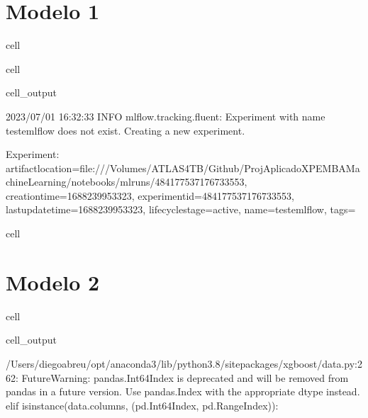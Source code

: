 \documentclass[letterpaper,10pt,brazil]{sphinxmanual}
\begin{document}
\section{Modelo 1}
\label{\detokenize{notebooks/teste:modelo-1}}
\begin{sphinxuseclass}{cell}
\end{sphinxuseclass}
\begin{sphinxuseclass}{cell}
\begin{sphinxuseclass}{cell_output}
\begin{sphinxVerbatim}[commandchars=\\\{\}]
2023/07/01 16:32:33 INFO mlflow.tracking.fluent: Experiment with name \PYGZsq{}teste\PYGZhy{}mlflow\PYGZsq{} does not exist. Creating a new experiment.
\end{sphinxVerbatim}

\begin{sphinxVerbatim}[commandchars=\\\{\}]
\PYGZlt{}Experiment: artifact\PYGZus{}location=\PYGZsq{}file:///Volumes/ATLAS\PYGZus{}4TB/Github/Proj\PYGZhy{}Aplicado\PYGZhy{}XPE\PYGZhy{}MBA\PYGZhy{}Machine\PYGZhy{}Learning/notebooks/mlruns/484177537176733553\PYGZsq{}, creation\PYGZus{}time=1688239953323, experiment\PYGZus{}id=\PYGZsq{}484177537176733553\PYGZsq{}, last\PYGZus{}update\PYGZus{}time=1688239953323, lifecycle\PYGZus{}stage=\PYGZsq{}active\PYGZsq{}, name=\PYGZsq{}teste\PYGZhy{}mlflow\PYGZsq{}, tags=\PYGZob{}\PYGZcb{}\PYGZgt{}
\end{sphinxVerbatim}

\end{sphinxuseclass}
\end{sphinxuseclass}
\begin{sphinxuseclass}{cell}
\end{sphinxuseclass}

\section{Modelo 2}
\label{\detokenize{notebooks/teste:modelo-2}}
\begin{sphinxuseclass}{cell}
\begin{sphinxuseclass}{cell_output}
\begin{sphinxVerbatim}[commandchars=\\\{\}]
/Users/diegoabreu/opt/anaconda3/lib/python3.8/site\PYGZhy{}packages/xgboost/data.py:262: FutureWarning: pandas.Int64Index is deprecated and will be removed from pandas in a future version. Use pandas.Index with the appropriate dtype instead.
  elif isinstance(data.columns, (pd.Int64Index, pd.RangeIndex)):
\end{sphinxVerbatim}

\end{sphinxuseclass}
\end{sphinxuseclass}


\renewcommand{\indexname}{Index}
\printindex
\end{document}
